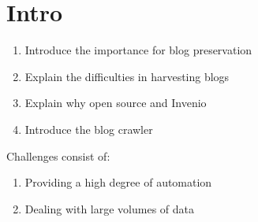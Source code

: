 \section{Intro}

\begin{enumerate}
  \item Introduce the importance for blog preservation
  \item Explain the difficulties in harvesting blogs
  \item Explain why open source and Invenio
  \item Introduce the blog crawler
\end{enumerate}

Challenges consist of:
\begin{enumerate}
  \item Providing a high degree of automation
  \item Dealing with large volumes of data
\end{enumerate}


